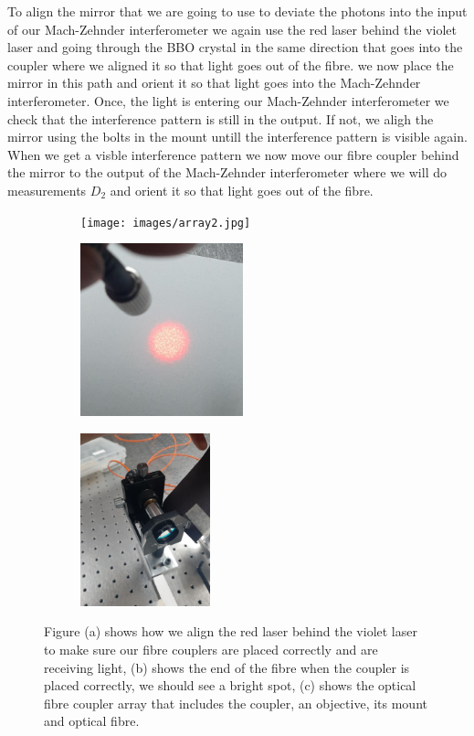 \documentclass[12pt]{book}
\begin{document}
To align the mirror that we are going to use to deviate the photons into the input of our Mach-Zehnder interferometer we again use the red laser behind the violet laser and going through the BBO crystal in the same direction that goes into the coupler where we aligned it so that light goes out of the fibre. we now place the mirror in this path and orient it so that light goes into the Mach-Zehnder interferometer. Once, the light is entering our Mach-Zehnder interferometer we check that the interference pattern is still in the output. If not, we aligh the mirror using the bolts in the mount untill the interference pattern is visible again. When we get a visble interference pattern we now move our fibre coupler behind the mirror to the output of the Mach-Zehnder interferometer where we will do measurements $D_{2}$ and orient it so that light goes out of the fibre. 



\begin{figure}[t!]
\centering
\begin{subfigure}[b]{0.3\linewidth}
\texttt{[image: images/array2.jpg]}
\caption{}
\end{subfigure}
\begin{subfigure}[b]{0.3\linewidth}
\includegraphics[width=\linewidth,height=5cm]{images/outfibre.jpg}
\caption{}
\end{subfigure}
\begin{subfigure}[b]{0.3\linewidth}
\includegraphics[width=\linewidth,height=5cm]{images/fibre.jpg}
\caption{}
\end{subfigure}
\caption{Figure (a) shows how we align the red laser behind the violet laser to make sure our fibre couplers are placed correctly and are receiving light, (b) shows the end of the fibre when the coupler is placed correctly, we should see a bright spot, (c) shows the optical fibre coupler array that includes the coupler, an objective, its mount and optical fibre.}
\label{fig:coupler}
\end{figure}
\end{document}
